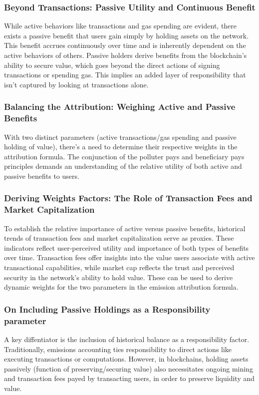\documentclass[11pt]{report}
\begin{document}
\subsubsection*{Beyond Transactions: Passive Utility and Continuous Benefit}
While active behaviors like transactions and gas spending are evident, there exists a passive benefit that users gain simply by holding assets on the network. This benefit accrues continuously over time and is inherently dependent on the active behaviors of others. Passive holders derive benefits from the blockchain's ability to secure value, which goes beyond the direct actions of signing transactions or spending gas. This implies an added layer of responsibility that isn't captured by looking at transactions alone.

\subsubsection*{Balancing the Attribution: Weighing Active and Passive Benefits}
With two distinct parameters (active transactions/gas spending and passive holding of value), there's a need to determine their respective weights in the attribution formula. The conjunction of the polluter pays and beneficiary pays principles demands an understanding of the relative utility of both active and passive benefits to users.

\subsubsection*{Deriving Weights Factors: The Role of Transaction Fees and Market Capitalization}
To establish the relative importance of active versus passive benefits, historical trends of transaction fees and market capitalization serve as proxies. These indicators reflect user-perceived utility and importance of both types of benefits over time. Transaction fees offer insights into the value users associate with active transactional capabilities, while market cap reflects the trust and perceived security in the network's ability to hold value. These can be used to derive dynamic weights for the two parameters in the emission attribution formula.



\subsubsection*{On Including Passive Holdings as a Responsibility parameter}
A key diffentiator is the inclusion of historical balance as a responsibility factor. Traditionally, emissions accounting ties responsibility to direct actions like executing transactions or computations.  However, in blockchains, holding assets passively (function of preserving/securing value) also necessitates ongoing mining and transaction fees payed by transacting users, in order to preserve liquidity and value.
\end{document}
